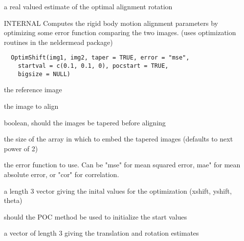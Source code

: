 \documentclass[a4paper]{book}
\begin{document}
%
\begin{Value}
a real valued estimate of the optimal alignment rotation
\end{Value}
%
\begin{Description}\relax
INTERNAL Computes the rigid body motion alignment
parameters by optimizing some error function comparing
the two images. (uses optimization routines in the
neldermead package)
\end{Description}
%
\begin{Usage}
\begin{verbatim}
  OptimShift(img1, img2, taper = TRUE, error = "mse",
    startval = c(0.1, 0.1, 0), pocstart = TRUE,
    bigsize = NULL)
\end{verbatim}
\end{Usage}
%
\begin{Arguments}
\begin{ldescription}
\item[\code{img1}] the reference image

\item[\code{img2}] the image to align

\item[\code{taper}] boolean, should the images be tapered before
aligning

\item[\code{bigsize}] the size of the array in which to embed
the tapered images (defaults to next power of 2)

\item[\code{error}] the error function to use. Can be "mse" for
mean squared error, mae" for mean absolute error, or
"cor" for correlation.

\item[\code{startval}] a length 3 vector giving the inital
values for the optimization (xshift, yshift, theta)

\item[\code{pocstart}] should the POC method be used to
initialize the start values
\end{ldescription}
\end{Arguments}
%
\begin{Value}
a vector of length 3 giving the translation and rotation
estimates
\end{Value}
\end{document}
